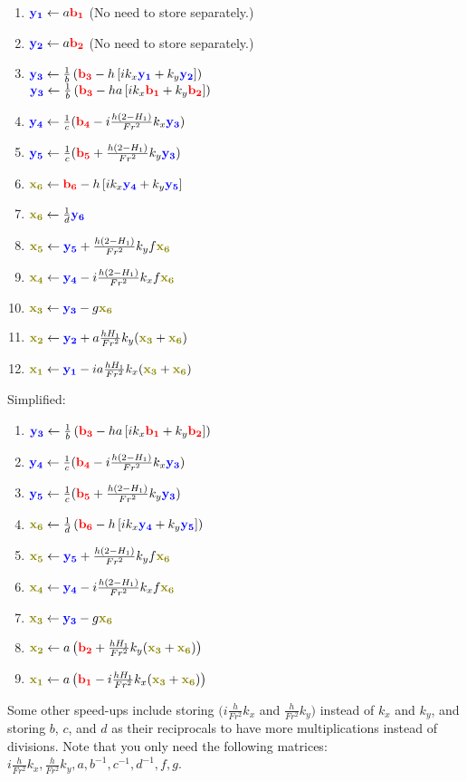 \documentclass[10pt]{article}
\newcommand{\mbfb}[1]{{\color{blue}\mathbf{#1}}}
\newcommand{\mbfr}[1]{{\color{red}\mathbf{#1}}}
\newcommand{\mbfg}[1]{{\color{olive}\mathbf{#1}}}
\begin{document}
\begin{enumerate}
	\item $\mbfb{y_1}\gets a\mbfr{b_1}$ (No need to store separately.)
	\item $\mbfb{y_2}\gets a \mbfr{b_2}$ (No need to store separately.)
	\item $\mbfb{y_3} \gets \frac{1}{b} \left(\mbfr{b_3} -h \left[i k_x \mbfb{y_1} + k_y \mbfb{y_2}\right]\right)$ \\ 
	$\mbfb{y_3} \gets \frac{1}{b} \left(\mbfr{b_3} -h a\left[i k_x \mbfr{b_1} + k_y \mbfr{b_2}\right]\right)$ 
	\item $\mbfb{y_4} \gets \frac{1}{c}(\mbfr{b_4} - i \frac{h(2-H_1)}{Fr^2}k_x \mbfb{y_3})$
	\item $\mbfb{y_5} \gets \frac{1}{c}(\mbfr{b_5} + \frac{h(2-H_1)}{Fr^2}k_y \mbfb{y_3})$
	\item $\mbfg{x_6} \gets \mbfr{b_6} -h \left[ik_x \mbfb{y_4} +k_y\mbfb{y_5}\right]$
	\item $\mbfg{x_6} \gets \frac{1}{d}\mbfb{y_6}$
	\item $\mbfg{x_5} \gets \mbfb{y_5} +\frac{h(2-H_1)}{Fr^2}k_yf\mbfg{x_6}$
	\item $\mbfg{x_4} \gets \mbfb{y_4} - i \frac{h(2-H_1)}{Fr^2}k_xf\mbfg{x_6}$
	\item $\mbfg{x_3} \gets \mbfb{y_3} - g\mbfg{x_6}$
	\item $\mbfg{x_2}\gets \mbfb{y_2} + a\frac{h H_1}{Fr^2}k_y (\mbfg{x_3}+\mbfg{x_6})$
	\item $\mbfg{x_1} \gets \mbfb{y_1} - ia \frac{h H_1}{Fr^2}k_x(\mbfg{x_3}+\mbfg{x_6})$
\end{enumerate}

Simplified:

\begin{enumerate}
	\item $\mbfb{y_3} \gets \frac{1}{b} \left(\mbfr{b_3} -h a \left[i k_x \mbfr{b_1} + k_y \mbfr{b_2}\right]\right)$
	\item $\mbfb{y_4} \gets \frac{1}{c}(\mbfr{b_4} - i \frac{h(2-H_1)}{Fr^2}k_x \mbfb{y_3})$
	\item $\mbfb{y_5} \gets \frac{1}{c}(\mbfr{b_5} + \frac{h(2-H_1)}{Fr^2}k_y \mbfb{y_3})$
	\item $\mbfg{x_6} \gets \frac{1}{d}\left(\mbfr{b_6} -h \left[ik_x \mbfb{y_4} +k_y\mbfb{y_5}\right]\right)$
	\item $\mbfg{x_5} \gets \mbfb{y_5} +\frac{h(2-H_1)}{Fr^2}k_yf\mbfg{x_6}$
	\item $\mbfg{x_4} \gets \mbfb{y_4} - i \frac{h(2-H_1)}{Fr^2}k_xf\mbfg{x_6}$
	\item $\mbfg{x_3} \gets \mbfb{y_3} - g\mbfg{x_6}$
	\item $\mbfg{x_2}\gets a\left(\mbfr{b_2} + \frac{h H_1}{Fr^2}k_y (\mbfg{x_3}+\mbfg{x_6})\right)$
	\item $\mbfg{x_1} \gets a\left(\mbfr{b_1} - i \frac{h H_1}{Fr^2}k_x(\mbfg{x_3}+\mbfg{x_6})\right)$
\end{enumerate}
Some other speed-ups include storing $(i \frac{h}{Fr^2} k_x$ and $ \frac{h}{Fr^2}k_y)$ instead of $k_x$ and $k_y$, and storing $b$, $c$, and $d$ as their reciprocals to have more multiplications instead of divisions. 
Note that you only need the following matrices: $i \frac{h}{Fr^2} k_x, \frac{h}{Fr^2}k_y, a, b^{-1},c^{-1}, d^{-1}, f, g$.
\end{document}
